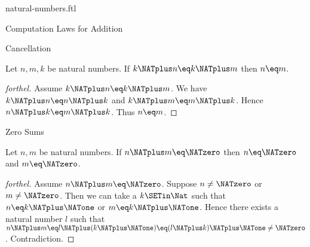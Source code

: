 \documentclass{naproche-library}
\begin{document}
\begin{smodule}[title=Natural Numbers]{natural-numbers.ftl}
\begin{sfragment}{Computation Laws for Addition}
\begin{sfragment}{Cancellation}
    \begin{corollary}[forthel,id=ARITHMETIC_03_8445946379632640]
      Let $n, m, k$ be natural numbers.
      If $k \NATplus n \eq k \NATplus m$ then $n \eq m$.
    \end{corollary}
    \begin{proof}[forthel]
      Assume $k \NATplus n \eq k \NATplus m$.
      We have $k \NATplus n \eq n \NATplus k$ and $k \NATplus m \eq m \NATplus k$.
      Hence $n \NATplus k \eq m \NATplus k$.
      Thus $n \eq m$.
    \end{proof}
  \end{sfragment}

  \begin{sfragment}{Zero Sums}
    \begin{proposition}[forthel,id=ARITHMETIC_03_3520602170195968]
      Let $n, m$ be natural numbers.
      If $n \NATplus m \eq \NATzero$ then $n \eq \NATzero$ and $m \eq \NATzero$.
    \end{proposition}
    \begin{proof}[forthel]
      Assume $n \NATplus m \eq \NATzero$.
      Suppose $n \neq \NATzero$ or $m \neq \NATzero$.
      Then we can take a $k \SETin \Nat$ such that $n \eq k \NATplus \NATone$ or $m \eq k \NATplus \NATone$.
      Hence there exists a natural number $l$ such that
      $n \NATplus m
        \eq l \NATplus (k \NATplus \NATone)
        \eq (l \NATplus k) \NATplus \NATone
        \neq \NATzero$.
      Contradiction.
    \end{proof}
  \end{sfragment}
\end{sfragment}
\end{smodule}
\end{document}
